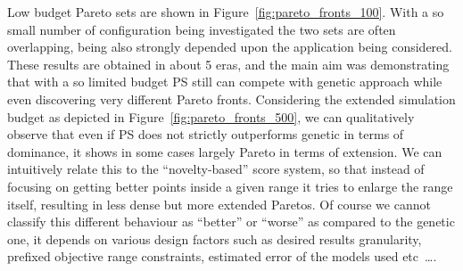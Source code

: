 \begin{table}
\end{table}
Low budget Pareto sets are shown in
Figure~\ref{fig:pareto_fronts_100}. With a so small number of
configuration being investigated the two sets are often overlapping,
being also strongly depended upon the application being considered.
These results are obtained in about 5 eras, and the main aim was
demonstrating that with a so limited budget PS still can compete with
genetic approach while even discovering very different Pareto fronts.
Considering the extended simulation budget as depicted in
Figure~\ref{fig:pareto_fronts_500}, we can qualitatively observe that
even if PS does not strictly outperforms genetic in terms of dominance, it shows in
some cases largely Pareto in terms of extension. We can intuitively
relate this to the ``novelty-based'' score system, so that instead of
focusing on getting better points inside a given range it tries to
enlarge the range itself, resulting in less dense but more extended
Paretos. Of course we cannot classify this different behaviour as
``better'' or ``worse'' as compared to the genetic one, it depends on
various design factors such as desired results granularity, prefixed objective
range constraints, estimated error of the models used etc~\ldots.

